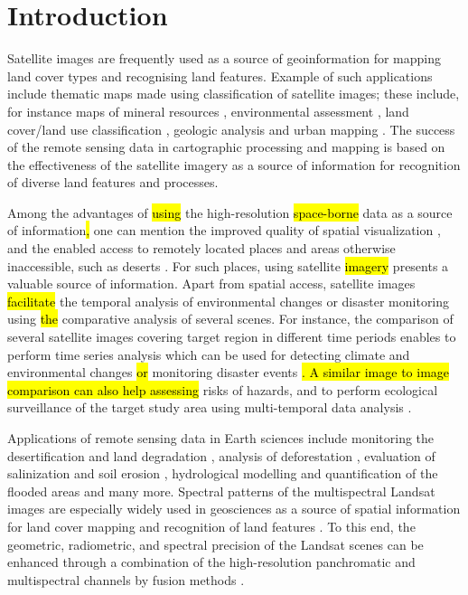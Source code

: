 \documentclass[information,article,submit,pdftex,moreauthors]{Definitions/mdpi}
\begin{document}
\section{Introduction}

Satellite images are frequently used as a source of geoinformation for mapping land cover types and recognising land features. Example of such applications include thematic maps made using classification of satellite images; these include, for instance maps of mineral resources \cite{ABDELKAREEM2018682,1294518,rs11121450}, environmental assessment \cite{615837,Lemenkova202227}, land cover/land use classification \cite{516791,Lemenkova202229}, geologic analysis \cite{6723607,KAMEL2022104420} and urban mapping \cite{MOHAMED2019103507}. The success of the remote sensing data in cartographic processing and mapping is based on the effectiveness of the satellite imagery as a source of information for recognition of diverse land features and processes. 

Among the advantages of \hl{using } the high-resolution \hl{space-borne } data as a source of information\hl{, } one can mention the improved quality of spatial visualization \cite{ABDALLA20128,Lemenkova202230}, and the enabled access to remotely located places and areas otherwise inaccessible, such as deserts \cite{6350376}. For such places, using satellite \hl{imagery } presents a valuable source of information. Apart from spatial access, satellite images \hl{facilitate } the temporal analysis of environmental changes or disaster monitoring using \hl{the } comparative analysis of several scenes. For instance, the comparison of several satellite images covering target region in different time periods enables to perform time series analysis which can be used for detecting climate and environmental changes \hl{or } monitoring disaster events \hl{. A similar image to image comparison can also help assessing } risks of hazards, and to perform ecological surveillance of the target study area using multi-temporal data analysis \cite{9171725,SINGH2020423,Hashim}. 

Applications of remote sensing data in Earth sciences include monitoring the desertification and land degradation \cite{Badreldin,Kawy}, analysis of deforestation \cite{516791}, evaluation of salinization \cite{8949893} and soil erosion \cite{Gad2020}, hydrological modelling and quantification of the flooded areas \cite{TAHA2017157,ELSADEK2019377} and many more. Spectral patterns of the multispectral Landsat images are especially widely used in geosciences as a source of spatial information for land cover mapping and recognition of land features \cite{8486245}. To this end, the geometric, radiometric, and spectral precision of the Landsat scenes can be enhanced through a combination of the high-resolution panchromatic and multispectral channels by fusion methods \cite{4420687}.
\end{document}
